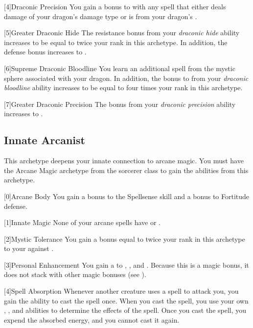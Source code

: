        [4]{Draconic Precision} You gain a  bonus to  with any spell that either deals damage of your dragon's damage type or is from your dragon's .

        [5]{Greater Draconic Hide} The resistance bonus from your \textit{draconic hide} ability increases to be equal to twice your rank in this archetype.
        In addition, the defense bonus increases to .

        [6]{Supreme Draconic Bloodline} You learn an additional spell from the mystic sphere associated with your dragon.
        In addition, the bonus to  from your \textit{draconic bloodline} ability increases to be equal to four times your rank in this archetype.

        [7]{Greater Draconic Precision} The bonus from your \textit{draconic precision} ability increases to .

    \newpage
    \subsection{Innate Arcanist}
        This archetype deepens your innate connection to arcane magic.
        You must have the Arcane Magic archetype from the sorcerer class to gain the abilities from this archetype.

        [0]{Arcane Body} You gain a  bonus to the Spellsense skill and a  bonus to Fortitude defense.

        [1]{Innate Magic} None of your arcane spells have  or .

        [2]{Mystic Tolerance} You gain a bonus equal to twice your rank in this archetype to your  against .

        [3]{Personal Enhancement} You gain a   to , , and .
        Because this is a magic bonus, it does not stack with other magic bonuses (see ).

        [4]{Spell Absorption} Whenever another creature uses a spell to attack you, you gain the ability to cast the spell once.
        When you cast the spell, you use your own , , and abilities to determine the effects of the spell.
        Once you cast the spell, you expend the absorbed energy, and you cannot cast it again.

